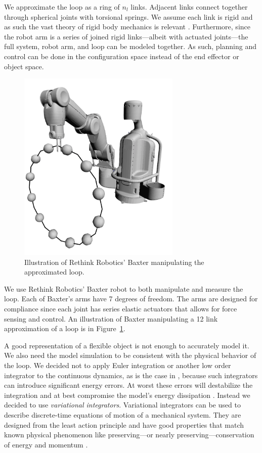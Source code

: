 \documentclass[letterpaper, 10pt, conference]{ieeeconf}
\begin{document}
We approximate the loop as a ring of $n_l$ links.  Adjacent links connect together through spherical joints with torsional springs. We assume each link is rigid and as such the vast theory of rigid body mechanics is relevant \cite{murray_li_sastry}.  Furthermore, since the robot arm is a series of joined rigid links---albeit with actuated joints---the full system, robot arm, and loop can be modeled together.  As such, planning and control can be done in the configuration space instead of the end effector or object space. 

\begin{figure}
\centering
\includegraphics[width = 220pt]{init_bloop.pdf}
\caption{Illustration of Rethink Robotics' Baxter manipulating the approximated loop.}
\label{fig-baxter_image_1}
\end{figure}

We use Rethink Robotics' Baxter \cite{guizzo2011rethink} robot to both manipulate and measure the loop.  Each of Baxter's arms have 7 degrees of freedom.  The arms are designed for compliance since each joint has series elastic actuators that allows for force sensing and control.  An illustration of Baxter manipulating a 12 link approximation of a loop is in Figure~\ref{fig-baxter_image_1}.

A good representation of a flexible object is not enough to accurately model it.  We also need the model simulation to be consistent with the physical behavior of the loop.  We decided not to apply Euler integration or another low order integrator to the continuous dynamics, as is the case in \cite{sahari_etal}, because such integrators can introduce significant energy errors.  At worst these errors will destabilize the integration and at best compromise the model's energy dissipation \cite{johnson_murphey_scalable}.  Instead we decided to use \emph{variational integrators}.  Variational integrators can be used to describe discrete-time equations of motion of a mechanical system.  They are designed from the least action principle and have good properties that match known physical phenomenon like preserving---or nearly preserving---conservation of energy and momentum \cite{johnson_murphey_scalable, marsden_west}.
\end{document}
